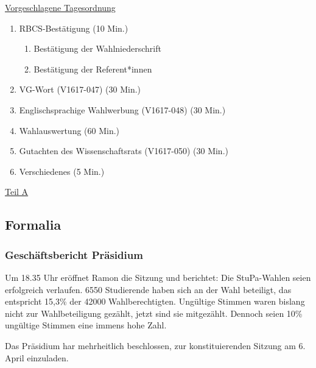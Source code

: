 \documentclass[ngerman,headheight=70pt]{scrartcl}
\begin{document}
    \newpage
    \underline{Vorgeschlagene Tagesordnung}
    \begin{enumerate}[label={\textbf{Top \theenumi}},leftmargin=*]
        \item RBCS-Bestätigung (10 Min.)
        \begin{enumerate}
            \item Bestätigung der Wahlniederschrift
            \item Bestätigung der Referent*innen
        \end{enumerate}
        \item VG-Wort (V1617-047) (30 Min.)
        \item Englischsprachige Wahlwerbung (V1617-048) (30 Min.)
        \item Wahlauswertung (60 Min.)
        \item Gutachten des Wissenschaftsrats (V1617-050) (30 Min.)
        \item Verschiedenes (5 Min.)
    \end{enumerate}

    \newpage


    {\Large \underline{Teil A}}

    \subsection{Formalia}

    \subsubsection{Geschäftsbericht Präsidium}

    Um 18.35 Uhr eröffnet Ramon die Sitzung und berichtet: Die StuPa-Wahlen
    seien erfolgreich verlaufen. 6550 Studierende haben sich an der Wahl
    beteiligt, das entspricht 15,3\% der 42000 Wahlberechtigten. Ungültige
    Stimmen waren bislang nicht zur Wahlbeteiligung gezählt, jetzt sind sie
    mitgezählt. Dennoch seien 10\% ungültige Stimmen eine immens hohe Zahl.

    Das Präsidium har mehrheitlich beschlossen, zur konstituierenden Sitzung am
    6. April einzuladen.
\end{document}
